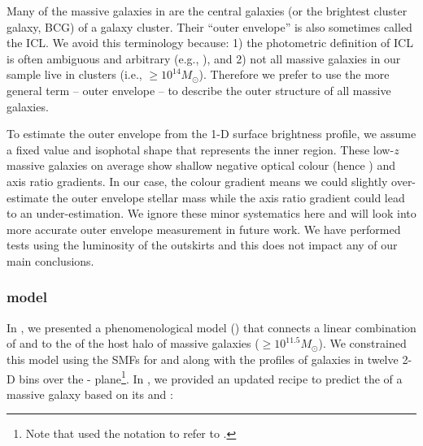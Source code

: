 \documentclass[fleqn,usenatbib,useAMS]{mnras}
\begin{document}
    Many of the massive galaxies in \citet{Huang2020} are the central galaxies (or the brightest
    cluster galaxy, BCG) of a galaxy cluster. 
    Their ``outer envelope'' is also sometimes called the ICL.  
    We avoid this terminology because:
    1) the photometric definition of ICL is often ambiguous and arbitrary (e.g.,
    \citealt{Kluge2021}), and
    2) not all massive galaxies in our sample live in clusters (i.e., \mvir{}$\geq 10^{14}
    M_{\odot}$).  Therefore we prefer to use the more general term -- outer envelope -- to describe
    the outer structure of all massive galaxies.
    
    To estimate the outer envelope \mstar{} from the 1-D surface brightness profile, we
    assume a fixed \mlratio{} value and isophotal shape that represents the inner region.
    These low-$z$ massive galaxies on average show shallow negative optical colour (hence \mlratio{})
    and axis ratio gradients. 
    In our case, the colour gradient means we could slightly over-estimate the outer envelope stellar
    mass while the axis ratio gradient could lead to an under-estimation.
    We ignore these minor systematics here and will look into more accurate outer envelope \mstar{}
    measurement in future work.
    We have performed \topn{} tests using the luminosity of the outskirts and this does not impact
    any of our main conclusions.

\subsubsection{\asap{} model}
    \label{sec:masap}

    In \citet{Huang2020}, we presented a phenomenological model (\asap{}) that connects a linear
    combination of  and  to the \mvir{} of the host halo of massive galaxies
    ($\geq 10^{11.5} M_{\odot}$).
    We constrained this model using the SMFs for  and  along with the \dsigma{}
    profiles of galaxies in twelve 2-D bins over the - plane\footnote{Note that
    \citet{Huang2020} used the notation \mmax{} to refer to .}.
    In \citet{Ardila2021}, we provided an updated \asap{} recipe to predict the \mvir{} of a
    massive galaxy based on its  and :
\end{document}

